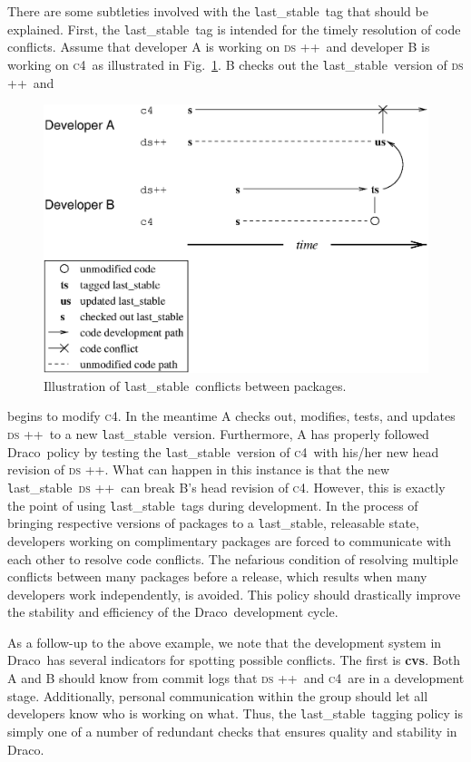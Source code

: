 \documentclass[11pt]{nmemo}
\newcommand{\draco}{{\normalfont\normalsize\textsf Draco}}
\newcommand{\cfour}{{\normalfont\normalsize\scshape c\small 4}}
\newcommand{\dsxx}{{\normalfont\normalsize\scshape ds\raisebox{.2ex}
  {\scriptsize ++}}}
\newcommand{\stable}{{\normalfont\normalsize\texttt last\_stable}}
\begin{document}
There are some subtleties involved with the \stable\ tag that should
be explained.  First, the \stable\ tag is intended for the timely
resolution of code conflicts.  Assume that developer A is working on
\dsxx\ and developer B is working on \cfour\ as illustrated in
Fig.~\ref{fig:ab}.  B checks out the \stable\ version of \dsxx\ and
\begin{figure}
  \centerline{\includegraphics[width=5in]{AB.eps}}
  \caption{Illustration of \stable\ conflicts between packages.}
  \label{fig:ab}
\end{figure}
begins to modify \cfour.  In the meantime A checks out, modifies,
tests, and updates \dsxx\ to a new \stable\ version.  Furthermore, A
has properly followed \draco\ policy by testing the \stable\ version
of \cfour\ with his/her new head revision of \dsxx.  What can happen
in this instance is that the new \stable\ \dsxx\ can break B's head
revision of \cfour.  However, this is exactly the point of using
\stable\ tags during development.  In the process of bringing
respective versions of packages to a \stable, releasable state,
developers working on complimentary packages are forced to communicate
with each other to resolve code conflicts.  The nefarious condition of
resolving multiple conflicts between many packages before a release,
which results when many developers work independently, is avoided.
This policy should drastically improve the stability and efficiency of
the \draco\ development cycle.

As a follow-up to the above example, we note that the development
system in \draco\ has several indicators for spotting possible
conflicts.  The first is {\bf cvs}.  Both A and B should know from
commit logs that \dsxx\ and \cfour\ are in a development stage.
Additionally, personal communication within the group should let all
developers know who is working on what.  Thus, the \stable\ tagging
policy is simply one of a number of redundant checks that ensures
quality and stability in \draco.
\end{document}
